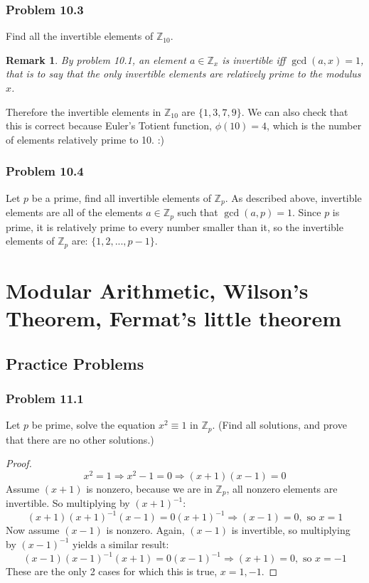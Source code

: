 \documentclass[hidelinks,12pt]{article}
\newtheorem*{remark}{Remark}
\newcommand{\Z}{\mathbb{Z}}
\begin{document}
\subsubsection{Problem 10.3}
Find all the invertible elements of $\Z_{10}$.
\begin{remark}
By problem 10.1, an element $a\in\Z_{x}$ is invertible iff $\gcd{(a,x)}=1$, that is to say that the only invertible elements are relatively prime to the modulus $x$.\end{remark}
Therefore the invertible elements in $\Z_{10}$ are $\{1,3,7,9\}$. We can also check that this is correct because Euler's Totient function, $\phi(10)=4$, which is the number of elements relatively prime to 10. :)
\subsubsection{Problem 10.4}
Let $p$ be a prime, find all invertible elements of $\Z_{p}$.
\newline As described above, invertible elements are all of the elements $a\in\Z_{p}$ such that $\gcd{(a,p)=1}$. Since $p$ is prime, it is relatively prime to every number smaller than it, so the invertible elements of $\Z_{p}$ are: $\{1,2,...,p-1\}$.
\newpage
\section{Modular Arithmetic, Wilson’s Theorem, Fermat’s little theorem}
\subsection{Practice Problems}
\subsubsection{Problem 11.1}
Let $p$ be prime, solve the equation $x^2\equiv1$ in $\Z_p$. (Find all solutions, and prove that there are no other solutions.)
\begin{proof}
$$x^2=1\Longrightarrow x^2-1=0\Longrightarrow(x+1)(x-1)=0$$ Assume $(x+1)$ is nonzero, because we are in $\Z_p$, all nonzero elements are invertible. So multiplying by $(x+1)^{-1}$: $$(x+1)(x+1)^{-1}(x-1)=0(x+1)^{-1}\Longrightarrow(x-1)=0,\text{ so }x=1$$ Now assume $(x-1)$ is nonzero. Again, $(x-1)$ is invertible, so multiplying by $(x-1)^{-1}$ yields a similar result:$$(x-1)(x-1)^{-1}(x+1)=0(x-1)^{-1}\Longrightarrow(x+1)=0,\text{ so }x=-1$$ These are the only 2 cases for which this is true, $x=1,-1$.
\end{proof}
\end{document}
